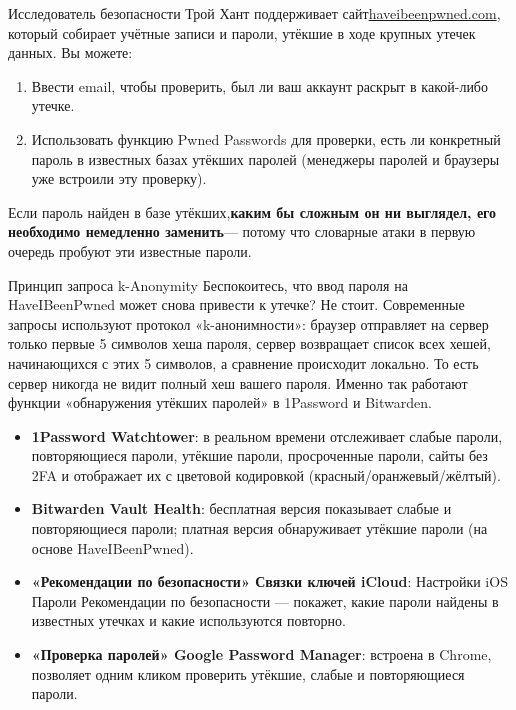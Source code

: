 
Исследователь безопасности Трой Хант поддерживает сайт\href{https://haveibeenpwned.com}{haveibeenpwned.com}, который собирает учётные записи и пароли, утёкшие в ходе крупных утечек данных. Вы можете:

\begin{enumerate}
  \item Ввести email, чтобы проверить, был ли ваш аккаунт раскрыт в какой-либо утечке.
  \item Использовать функцию Pwned Passwords для проверки, есть ли конкретный пароль в известных базах утёкших паролей (менеджеры паролей и браузеры уже встроили эту проверку).
\end{enumerate}

Если пароль найден в базе утёкших,\textbf{каким бы сложным он ни выглядел, его необходимо немедленно заменить}— потому что словарные атаки в первую очередь пробуют эти известные пароли.

\begin{tcbinfo}{Принцип запроса k-Anonymity}
Беспокоитесь, что ввод пароля на HaveIBeenPwned может снова привести к утечке? Не стоит. Современные запросы используют протокол «k-анонимности»: браузер отправляет на сервер только первые 5 символов хеша пароля, сервер возвращает список всех хешей, начинающихся с этих 5 символов, а сравнение происходит локально. То есть сервер никогда не видит полный хеш вашего пароля. Именно так работают функции «обнаружения утёкших паролей» в 1Password и Bitwarden.

\end{tcbinfo}


\begin{itemize}
  \item \textbf{1Password Watchtower}: в реальном времени отслеживает слабые пароли, повторяющиеся пароли, утёкшие пароли, просроченные пароли, сайты без 2FA и отображает их с цветовой кодировкой (красный/оранжевый/жёлтый).
  \item \textbf{Bitwarden Vault Health}: бесплатная версия показывает слабые и повторяющиеся пароли; платная версия обнаруживает утёкшие пароли (на основе HaveIBeenPwned).
  \item \textbf{«Рекомендации по безопасности» Связки ключей iCloud}: Настройки iOS Пароли Рекомендации по безопасности — покажет, какие пароли найдены в известных утечках и какие используются повторно.
  \item \textbf{«Проверка паролей» Google Password Manager}: встроена в Chrome, позволяет одним кликом проверить утёкшие, слабые и повторяющиеся пароли.
\end{itemize}

